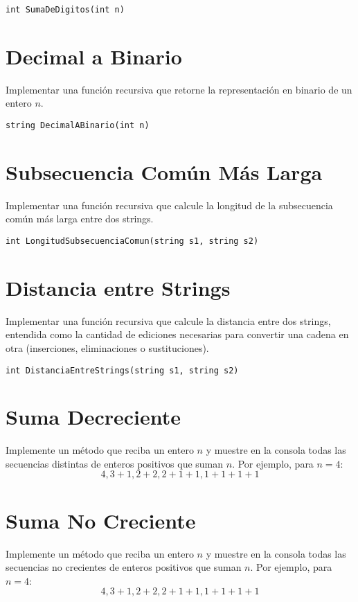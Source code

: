 \begin{verbatim}
int SumaDeDigitos(int n)
\end{verbatim}

\section{Decimal a Binario}
Implementar una función recursiva que retorne la representación en binario de un entero \( n \).

\begin{verbatim}
string DecimalABinario(int n)
\end{verbatim}

\section{Subsecuencia Común Más Larga}
Implementar una función recursiva que calcule la longitud de la subsecuencia común más larga entre dos strings.

\begin{verbatim}
int LongitudSubsecuenciaComun(string s1, string s2)
\end{verbatim}

\section{Distancia entre Strings}
Implementar una función recursiva que calcule la distancia entre dos strings, entendida como la cantidad de ediciones necesarias para convertir una cadena en otra (inserciones, eliminaciones o sustituciones).

\begin{verbatim}
int DistanciaEntreStrings(string s1, string s2)
\end{verbatim}

\section{Suma Decreciente}
Implemente un método que reciba un entero \( n \) y muestre en la consola todas las secuencias distintas de enteros positivos que suman \( n \). Por ejemplo, para \( n = 4 \):
\[
4, 3+1, 2+2, 2+1+1, 1+1+1+1
\]

\section{Suma No Creciente}
Implemente un método que reciba un entero \( n \) y muestre en la consola todas las secuencias no crecientes de enteros positivos que suman \( n \). Por ejemplo, para \( n = 4 \):
\[
4, 3+1, 2+2, 2+1+1, 1+1+1+1
\]

